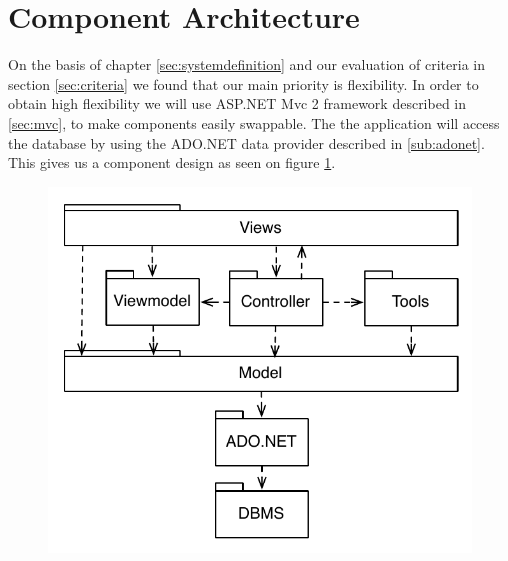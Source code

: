 \section{Component Architecture}
\label{sec:components}
On the basis of chapter \ref{sec:systemdefinition} and our evaluation of criteria in section \ref{sec:criteria} we found that our main priority is flexibility. 
In order to obtain high flexibility we will use ASP.NET Mvc 2 framework described in \ref{sec:mvc}, to make components easily swappable.
The the application will access the database by using the ADO.NET data provider described in \ref{sub:adonet}. This gives us a component design as seen on figure \ref{fig:system_component_mvc}.

\begin{figure}
	\centering
		\includegraphics[scale=0.8]{input/architectural_design/system_component_mvc.pdf}
	\label{fig:system_component_mvc}
\end{figure}

